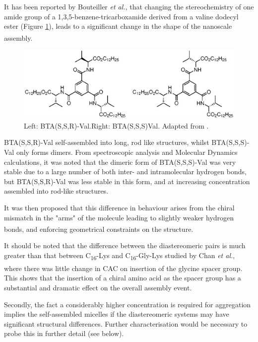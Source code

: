 It has been reported by Bouteiller \textit{et al.}, that changing the stereochemistry of one amide group of a 1,3,5-benzene-tricarboxamide derived from a valine dodecyl ester (Figure \ref{BTA_structure}), leads to a significant change in the shape of the nanoscale assembly.\textsuperscript{\cite{Caumes2016TuningStereochemistry}}

\begin{figure} [ht!]
\centering
\includegraphics{Figures/BTA_structure.eps}
\caption{Left: BTA(S,S,R)-Val.\newline Right: BTA(S,S,S)Val. 
Adapted from \cite{Caumes2016TuningStereochemistry}.}
\label{BTA_structure}
\end{figure}

BTA(S,S,R)-Val self-assembled into long, rod like structures, whilst BTA(S,S,S)-Val only forms dimers. From spectroscopic analysis and Molecular Dynamics calculations, it was noted that the dimeric form of BTA(S,S,S)-Val was very stable due to a large number of both inter- and intramolecular hydrogen bonds, but BTA(S,S,R)-Val was less stable in this form, and at increasing concentration assembled into rod-like structures.

It was then proposed that this difference in behaviour arises from the chiral mismatch in the "arms" of the molecule leading to slightly weaker hydrogen bonds, and enforcing geometrical constraints on the structure.\textsuperscript{\cite{Caumes2016TuningStereochemistry}} 

It should be noted that the difference between the diastereomeric pairs is much greater than that between C\textsubscript{16}-Lys and C\textsubscript{16}-Gly-Lys studied by Chan \textit{et al.}, where there was little change in CAC on insertion of the glycine spacer group.\textsuperscript{\cite{Chan2016ChiralBinding}} This shows that the insertion of a chiral amino acid as the spacer group has a substantial and dramatic effect on the overall assembly event. 

Secondly, the fact a considerably higher concentration is required for aggregation implies the self-assembled micelles if the diastereomeric systems may have significant structural differences. Further characterisation would be necessary to probe this in further detail (see below). 

